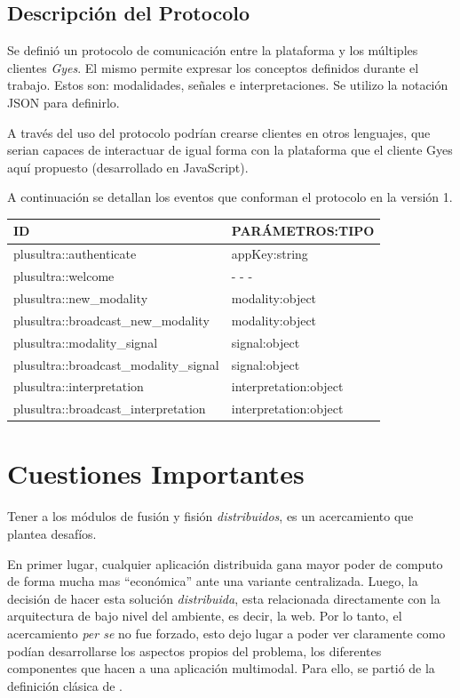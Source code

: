 \subsection{Descripción del Protocolo} \label{subsection:protocol}
Se definió un protocolo de comunicación entre la plataforma y los múltiples clientes \emph{Gyes}. El mismo permite expresar los conceptos definidos durante el trabajo. Estos son: modalidades, señales e interpretaciones. Se utilizo la notación JSON para definirlo.

A través del uso del protocolo podrían crearse clientes en otros lenguajes, que serian capaces de interactuar de igual forma con la plataforma que el cliente Gyes aquí propuesto (desarrollado en JavaScript). 

A continuación se detallan los eventos que conforman el protocolo en la versión 1.

\begin{center}
    \begin{tabular}{| l | l |}
    \hline
    ID & PARÁMETROS:TIPO \\ \hline
    plusultra::authenticate & appKey:string \\ \hline
    plusultra::welcome & - - - \\ \hline
    plusultra::new\_modality & modality:object \\ \hline
    plusultra::broadcast\_new\_modality & modality:object\\ \hline
    plusultra::modality\_signal & signal:object \\ \hline
    plusultra::broadcast\_modality\_signal & signal:object \\ \hline
    plusultra::interpretation & interpretation:object \\ \hline
    plusultra::broadcast\_interpretation & interpretation:object \\
    \hline
    \end{tabular}
\end{center}

\section{Cuestiones Importantes}
Tener a los módulos de fusión y fisión \emph{distribuidos}, es un acercamiento que plantea desafíos.

En primer lugar, cualquier aplicación distribuida gana mayor poder de computo de forma mucha mas ``económica'' ante una variante centralizada. Luego, la decisión de hacer esta solución \emph{distribuida}, esta relacionada directamente con la arquitectura de bajo nivel del ambiente, es decir, la web. Por lo tanto, el acercamiento \emph{per se} no fue forzado, esto dejo lugar a poder ver claramente como podían desarrollarse los aspectos propios del problema, \ie los diferentes componentes que hacen a una aplicación multimodal. Para ello, se partió de la definición clásica de  \citet{dumas2009multimodal}. 

